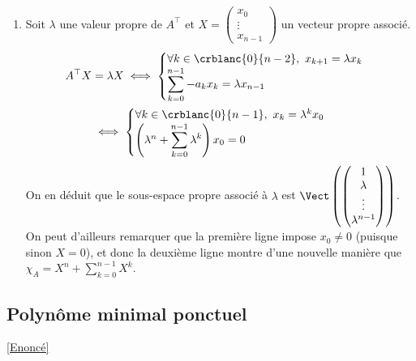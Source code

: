 \documentclass[8pt]{book}
\begin{document}
\begin{enumerate}
		Notons $(e_1,\dots,e_n)$ la base canonique de $\K^n$. On remarque que $\forall i\in \crblanc{1}{n-1},\ Ae_i=e_{i+1}$ i.e $\forall i\in \crblanc{0}{n-1},\ A^ie_1=e_i$.\\
		Donc la famille $(A^ie_1)_{0\leq i\leq n-1}$ est libre, et par suite c'est une base de $\K^n$. Montrons alors que la famille $(A^i)_{0\leq i\leq n-1}$ est libre dans $\K[A]$.\\
		Soit $(\alpha_0,\dots,\alpha_{n-1})\in \K^n,\ \displaystyle\sum_{i=0}^{n-1}\alpha_iA^i=0$.\\
		Alors $\displaystyle\sum_{i=0}^{n-1}\alpha_iA^ie_1=0$ d'où $\alpha_0=\cdots=\alpha_{n-1}=0$. On en déduit que $\dim(\K[A])\geq n$. Or d'après le cours $\dim(\K[A])=\deg(\pi_A)$. Ainsi $\deg(\pi_A)\geq \deg(\chi_A)$ et on conclut que $\pi_A=\chi_A$.
		\item Soit $\lambda$ une valeur propre de $A^\top$ et $X=\begin{pmatrix}x_0\\\vdots\\x_{n-1}\end{pmatrix}$ un vecteur propre associé.\\
		\begin{align*}
			A^\top X&=\lambda X\iff\begin{cases}
				\forall k\in \crblanc{0}{n-2},\ x_{k+1}=\lambda x_k\\
				\displaystyle\sum_{k=0}^{n-1}-a_kx_k=\lambda x_{n-1}
			\end{cases}\\
			&\iff\begin{cases}
				\forall k\in \crblanc{0}{n-1},\ x_k=\lambda^kx_0\\
				\left(\lambda^n+\displaystyle\sum_{k=0}^{n-1}\lambda^k\right)x_0=0
			\end{cases}
		\end{align*}
		On en déduit que le sous-espace propre associé à $\lambda$ est $\Vect\left(\begin{pmatrix}1\\\lambda\\\vdots\\\lambda^{n-1}\end{pmatrix}\right)$. On peut d'ailleurs remarquer que la première ligne impose $x_0\ne 0$ (puisque sinon $X=0$), et donc la deuxième ligne montre d'une nouvelle manière que $\chi_A=X^n+\displaystyle\sum_{k=0}^{n-1}X^k$.
	\end{enumerate}
	
	\subsection{Polynôme minimal ponctuel}
	\label{Polynôme minimal ponctuel corrigé}
	\textcolor{blue}{\hyperref[Polynôme minimal ponctuel]{[Enoncé]}}\\
	
\end{document}
